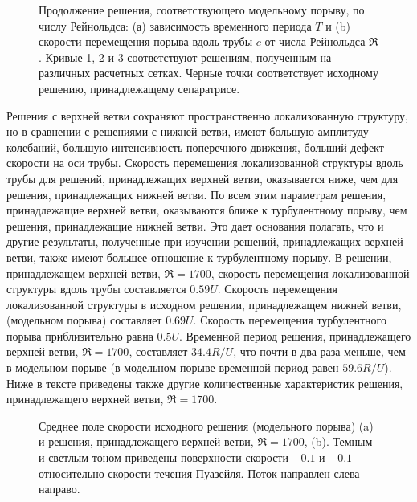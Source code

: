 \begin{figure}
\caption{Продолжение решения, соответствующего модельному порыву, по числу Рейнольдса: (а) зависимость временного периода $T$ и (b) скорости перемещения порыва вдоль трубы $c$ от числа Рейнольдса $\Re$. Кривые 1, 2 и 3 соответствуют решениям, полученным на различных расчетных сетках. Черные точки соответствует исходному решению, принадлежащему сепаратрисе.}
\label{local_contin_pic}
\end{figure}

Решения с верхней ветви сохраняют пространственно локализованную структуру, но в сравнении с решениями с нижней ветви, имеют большую амплитуду колебаний, большую интенсивность поперечного движения, больший дефект скорости на оси трубы. Скорость перемещения локализованной структуры вдоль трубы для решений, принадлежащих верхней ветви, оказывается ниже, чем для решения, принадлежащих нижней ветви. По всем этим параметрам решения, принадлежащие верхней ветви, оказываются ближе к турбулентному порыву, чем решения, принадлежащие нижней ветви. Это дает основания полагать, что и другие результаты, полученные при изучении решений, принадлежащих верхней ветви, также имеют большее отношение к турбулентному порыву. В решении, принадлежащем верхней ветви, $\Re = 1700$, скорость перемещения локализованной структуры вдоль трубы составляется $0.59U$. Скорость перемещения локализованной структуры в исходном решении, принадлежащем нижней ветви, (модельном порыва) составляет $0.69U$. Скорость перемещения турбулентного порыва приблизительно равна $0.5U$. Временной период решения, принадлежащего верхней ветви, $\Re = 1700$, составляет $34.4 R/U$, что почти в два раза меньше, чем в модельном порыве (в модельном порыве временной период равен $59.6R/U$). Ниже в тексте приведены также другие количественные характеристик решения, принадлежащего верхней ветви, $\Re = 1700$.


\begin{figure}
\caption{Среднее поле скорости исходного решения (модельного порыва) (a) и решения, принадлежащего верхней ветви, $\Re=1700$, (b). Темным и светлым тоном приведены поверхности скорости $-0.1$ и $+0.1$ относительно скорости течения Пуазейля. Поток направлен слева направо.}
\label{3D_contin_cmp_pic}
\end{figure}

